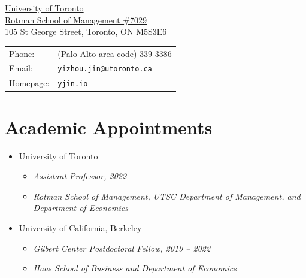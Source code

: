 {\huge \name}


\vspace{0.25in}
\begin{minipage}{0.45\linewidth}
  \href{https://www.utoronto.ca/}{University of Toronto} \\
  \href{https://www.rotman.utoronto.ca/FacultyAndResearch/Faculty/FacultyBios/Jin}{Rotman School of Management \#7029} \\ %
  105 St George Street, Toronto, ON M5S3E6
\end{minipage}
\begin{minipage}{0.45\linewidth}
  \begin{tabular}{ll}
    Phone: & (Palo Alto area code) 339-3386 \\
    Email: & \href{mailto:yizhou.jin@utoronto.ca}{\tt yizhou.jin@utoronto.ca} \\
    Homepage: & \href{https://yjin.io}{\tt yjin.io} \\
  \end{tabular}
\end{minipage}

\vspace{0.2cm}
\section*{Academic Appointments}

\begin{itemize}
\item University of Toronto
\begin{itemize}
\item \textit{Assistant Professor, 2022 -- }
\item \textit{Rotman School of Management, UTSC Department of Management, and Department of Economics}
\end{itemize}
\item University of California, Berkeley 
\begin{itemize}
\item \textit{Gilbert Center Postdoctoral Fellow, 2019 -- 2022}
\item \textit{Haas School of Business and Department of Economics}
\end{itemize}
\end{itemize}
\vspace{0.03cm}
